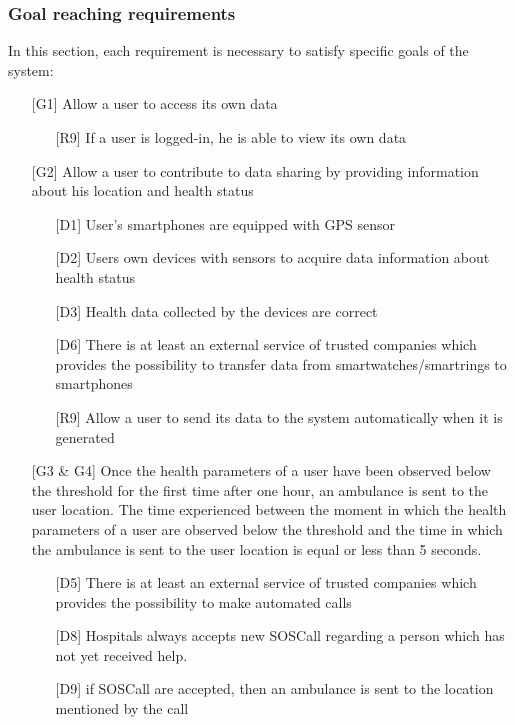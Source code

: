 \subsubsection{Goal reaching requirements}
\par
In this section, each requirement is necessary to satisfy specific goals of the system:
\begin{itemize}
\item[{[G1]}] Allow a user to access its own data
	\begin{itemize}
	\item[{[R9]}] If a user is logged-in, he is able to view its own data
	\end{itemize}
\item[{[G2]}] Allow a user to contribute to data sharing by providing information about his location and health status
	\begin{itemize}
	\item[{[D1]}]  User's smartphones are equipped with GPS sensor
	\item[{[D2]}] Users own devices with sensors to acquire data information about health status
	\item[{[D3]}] Health data collected by the devices are correct
	\item[{[D6]}] There is at least an external service of trusted companies which provides the possibility to transfer data from smartwatches/smartrings to smartphones
	\item[{[R9]}] Allow a user to send its data to the system automatically when it is generated
	\end{itemize}
\item[{[G3 \& G4]}] Once the health parameters of a user have been observed 
below the threshold for the first time after one hour, an ambulance is sent to the user location. 
The time experienced between the moment in which the health parameters of a user are observed below the threshold and the time in which the ambulance is sent to the user location is equal or less than 5 seconds. 
	\begin{itemize}
	\item[{[D5]}] There is at least an external service of trusted companies which provides the possibility to make automated calls
	\item[{[D8]}] Hospitals always accepts new SOSCall regarding a person which has not yet received help.
	\item[{[D9]}] if SOSCall are accepted, then an ambulance is sent to the location mentioned by the call

\end{itemize}
\end{itemize}
